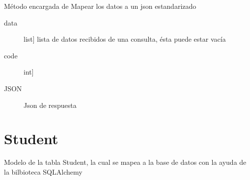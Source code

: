 \documentclass[a4paper,10pt,english]{sphinxmanual}
\begin{document}
\begin{fulllineitems}
\label{\detokenize{index:api3.helper.convert_data.sendResJson}}
\sphinxAtStartPar
Método encargada de Mapear los datos a un json estandarizado
\begin{description}
\item[{data}] \leavevmode{[}list{]}
\sphinxAtStartPar
lista de datos recibidos de una consulta, ésta puede estar vacía

\item[{code}] \leavevmode{[}int{]}

\end{description}
\begin{description}
\item[{JSON}] \leavevmode
\sphinxAtStartPar
Json de respuesta

\end{description}

\end{fulllineitems}

\label{\detokenize{index:module-api3.student_api.models.Student}}

\chapter{Student}
\label{\detokenize{index:student}}
\sphinxAtStartPar
Modelo de la tabla Student, la cual se mapea a la base de datos con la ayuda de la bilbioteca
SQLAlchemy
\end{document}
